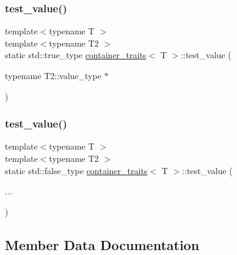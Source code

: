 \subsubsection{\texorpdfstring{test\_value()}{test\_value()}\hspace{0.1cm}{\footnotesize\ttfamily [1/2]}}
{\footnotesize\ttfamily template$<$typename T $>$ \\
template$<$typename T2 $>$ \\
static std\+::true\+\_\+type \mbox{\hyperlink{structcontainer__traits}{container\+\_\+traits}}$<$ T $>$\+::test\+\_\+value (\begin{DoxyParamCaption}\item[{typename T2\+::value\+\_\+type $\ast$}]{ }\end{DoxyParamCaption})\hspace{0.3cm}{\ttfamily [static]}}

\mbox{\label{structcontainer__traits_a8ed5be321721d91c3d68ef269b848988}} 
\subsubsection{\texorpdfstring{test\_value()}{test\_value()}\hspace{0.1cm}{\footnotesize\ttfamily [2/2]}}
{\footnotesize\ttfamily template$<$typename T $>$ \\
template$<$typename T2 $>$ \\
static std\+::false\+\_\+type \mbox{\hyperlink{structcontainer__traits}{container\+\_\+traits}}$<$ T $>$\+::test\+\_\+value (\begin{DoxyParamCaption}\item[{}]{... }\end{DoxyParamCaption})\hspace{0.3cm}{\ttfamily [static]}}



\subsection{Member Data Documentation}
\mbox{\label{structcontainer__traits_ab2461388054411125b0719d7faf82978}} 
